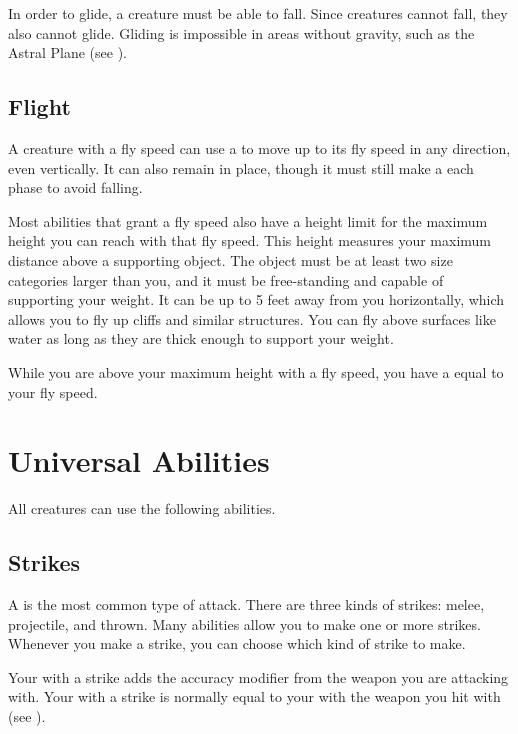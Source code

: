     In order to glide, a creature must be able to fall.
    Since  creatures cannot fall, they also cannot glide.
    Gliding is impossible in areas without gravity, such as the Astral Plane (see ).

  \subsection{Flight}\label{Flight}
    A creature with a fly speed can use a  to move up to its fly speed in any direction, even vertically.
    It can also remain in place, though it must still make a  each phase to avoid falling.

     Most abilities that grant a fly speed also have a height limit for the maximum height you can reach with that fly speed.
    This height measures your maximum distance above a supporting object.
    The object must be at least two size categories larger than you, and it must be free-standing and capable of supporting your weight.
    It can be up to 5 feet away from you horizontally, which allows you to fly up cliffs and similar structures.
    You can fly above surfaces like water as long as they are thick enough to support your weight.

    While you are above your maximum height with a fly speed, you have a  equal to your fly speed.

\section{Universal Abilities}\label{Universal Abilities}
  All creatures can use the following abilities.

  \subsection{Strikes}\label{Strikes}
    A  is the most common type of attack.
    There are three kinds of strikes: melee, projectile, and thrown.
    Many abilities allow you to make one or more strikes.
    Whenever you make a strike, you can choose which kind of strike to make.

    Your  with a strike adds the accuracy modifier from the weapon you are attacking with.
    Your  with a strike is normally equal to your  with the weapon you hit with (see ).

